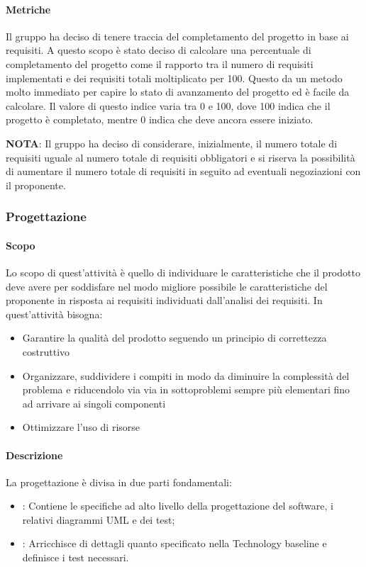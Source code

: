 \documentclass[../norme_di_progetto.tex]{subfiles}
\begin{document}
\paragraph{Metriche}
 Il gruppo ha deciso di tenere traccia del completamento del progetto in base ai requisiti. A questo scopo è stato deciso di calcolare una percentuale di completamento del progetto come il rapporto tra il numero di requisiti implementati e dei requisiti totali moltiplicato per 100. Questo da un metodo molto immediato per capire lo stato di avanzamento del progetto ed è facile da calcolare. Il valore di questo indice varia tra 0 e 100, dove 100 indica che il progetto è completato, mentre 0 indica che deve ancora essere iniziato. \par
 \textbf{NOTA}: Il gruppo ha deciso di considerare, inizialmente, il numero totale di requisiti uguale al numero totale di requisiti obbligatori e si riserva la possibilità di aumentare il numero totale di requisiti in seguito ad eventuali negoziazioni con il proponente.
 
\subsubsection{Progettazione}
 
    \paragraph{Scopo}
    Lo scopo di quest'attività è quello di individuare le caratteristiche che il prodotto deve avere per soddisfare nel modo migliore possibile le caratteristiche del proponente in risposta ai requisiti individuati dall'analisi dei requisiti. In quest'attività bisogna:
    \begin{itemize}
        \item Garantire la qualità del prodotto seguendo un principio di correttezza costruttivo
        \item Organizzare, suddividere i compiti in modo da diminuire la complessità del problema e riducendolo via via in sottoproblemi sempre più elementari fino ad arrivare ai singoli componenti
        \item Ottimizzare l'uso di risorse
    \end{itemize}

    \paragraph{Descrizione}
    La progettazione è divisa in due parti fondamentali:
    \begin{itemize}
        \item {}: Contiene le specifiche ad alto livello della progettazione del software, i relativi diagrammi UML e dei test;
        \item {}: Arricchisce di dettagli quanto specificato nella Technology baseline e definisce i test necessari.
    \end{itemize}
\end{document}
